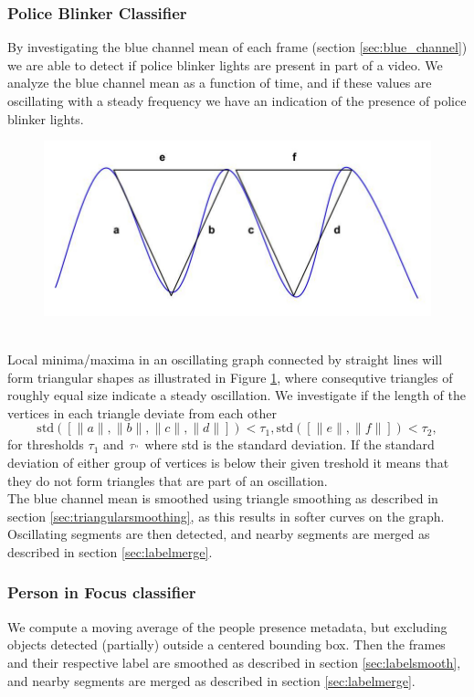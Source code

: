 \subsubsection{Police Blinker Classifier}\label{sec:police_detection}
%
By investigating the blue channel mean of each frame (section \ref{sec:blue_channel}) we are able to detect if police blinker lights are present in part of a video.
We analyze the blue channel mean as a function of time, and if these values are oscillating with a steady frequency we have an indication of the presence of police blinker lights.
%
\begin{figure}[!ht]
     \centering
     \includegraphics[width=1.05\textwidth]{img/triangles.jpg}
     \caption{}\label{fig:triangles}
\end{figure}\\
Local minima/maxima in an oscillating graph connected by straight lines will form triangular shapes as illustrated in Figure \ref{fig:triangles}, where consequtive triangles of roughly equal size indicate a steady oscillation. We investigate if the length of the vertices in each triangle deviate from each other
\[
\text{std}([\|a\|,\|b\|,\|c\|,\|d\|]) < \tau_1, \text{std}([\|e\|,\|f\|]) < \tau_2,
\]
for thresholds $\tau_1$ and $\tau_"$ where std is the standard deviation. If the standard deviation of either group of vertices is below their given treshold it means that they do not form triangles that are part of an oscillation.\\
The blue channel mean is smoothed using triangle smoothing as described in section \ref{sec:triangularsmoothing}, as this results in softer curves on the graph. Oscillating segments are then detected, and nearby segments are merged as described in section \ref{sec:labelmerge}.
%
\subsubsection{Person in Focus classifier}\label{sec:infocus}
%
We compute a moving average of the people presence metadata, but excluding objects detected (partially) outside a centered bounding box. Then the frames and their respective label are smoothed as described in section \ref{sec:labelsmooth}, and nearby segments are merged as described in section \ref{sec:labelmerge}. 
%
